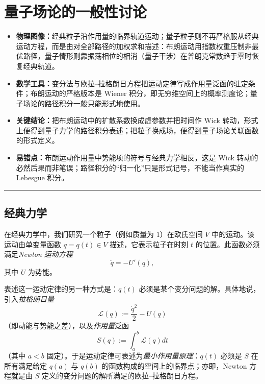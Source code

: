\section{量子场论的一般性讨论}

\begin{keytakeaways}
\begin{itemize}
  \item \textbf{物理图像：}经典粒子沿作用量的临界轨道运动；量子粒子则不再严格服从经典运动方程，而是由对全部路径的加权求和描述：布朗运动用指数权重压制非最优路径，量子情形则靠振荡相位的相消（量子干涉）在普朗克常数趋于零时恢复经典轨道。
  \item \textbf{数学工具：}变分法与欧拉–拉格朗日方程把运动定律写成作用量泛函的驻定条件；布朗运动的严格版本是 Wiener 积分，即无穷维空间上的概率测度论；量子场论的路径积分一般只能形式地使用。
  \item \textbf{关键结论：}把布朗运动中的扩散系数换成虚参数并把时间作 Wick 转动，形式上便得到量子力学的路径积分表述；把粒子换成场，便得到量子场论关联函数的形式定义。
  \item \textbf{易错点：}布朗运动作用量中势能项的符号与经典力学相反，这是 Wick 转动的必然后果而非笔误；路径积分的“归一化”只是形式记号，不能当作真实的 Lebesgue 积分。
\end{itemize}
\end{keytakeaways}

\bigskip
\noindent\rule{\textwidth}{0.6pt}
\bigskip

\subsection{经典力学}

在经典力学中，我们研究一个粒子（例如质量为 $1$）在欧氏空间 $V$ 中的运动。该运动由单变量函数 $q=q(t)\in V$ 描述，它表示粒子在时刻 $t$ 的位置。此函数必须满足\emph{Newton 运动方程}
$$
\ddot{q}=-U'(q),
$$
其中 $U$ 为势能。

表述这一运动定律的另一种方式是：$q(t)$ 必须是某个变分问题的解。具体地说，引入\emph{拉格朗日量}
$$
{\mathcal L}(q):=\frac{{\dot{q}}^2}{2}-U(q)
$$
（即动能与势能之差），以及\emph{作用量}泛函
$$
S(q):=\int_{a}^{b}{\mathcal L}(q)dt
$$
（其中 $a<b$ 固定）。于是运动定律可表述为\emph{最小作用量原理}：$q(t)$ 必须是 $S$ 在所有满足给定 $q(a)$ 与 $q(b)$ 的函数构成的空间上的临界点；亦即，Newton 方程就是由 $S$ 定义的变分问题的解所满足的欧拉–拉格朗日方程。

